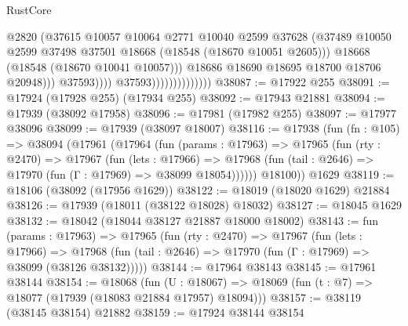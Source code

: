 \begin{lexlean}{RustCore}
\begin{coremodule}
                                              @2820
                                              (@37615
                                                @10057
                                                @10064
                                                @2771
                                                @10040
                                                @2599
                                                @37628
                                                (@37489
                                                  @10050
                                                  @2599
                                                  @37498
                                                  @37501
                                                  @18668
                                                  (@18548 (@18670 @10051 @2605)))
                                                @18668
                                                (@18548 (@18670 @10041 @10057)))
                                              @18686
                                              @18690
                                              @18695
                                              @18700
                                              @18706
                                              @20948)))
                                        @37593))))
                                @37593))))))))))))))
@38087 := @17922 @255
@38091 := @17924 (@17928 @255) (@17934 @255)
@38092 := @17943 @21881
@38094 := @17939 (@38092 @17958)
@38096 := @17981 (@17982 @255)
@38097 := @17977 @38096
@38099 := @17939 (@38097 @18007)
@38116 := @17938
    (fun (fn : @105) =>
    @38094
      (@17961
        (@17964
          (fun (params : @17963) =>
          @17965
            (fun (rty : @2470) =>
            @17967
              (fun (lets : @17966) =>
              @17968 (fun (tail : @2646) => @17970 (fun (Γ : @17969) => @38099 @18054))))))
        @18100))
    @1629
@38119 := @18106 (@38092 (@17956 @1629))
@38122 := @18019 (@18020 @1629) @21884
@38126 := @17939 (@18011 (@38122 @18028) @18032)
@38127 := @18045 @1629
@38132 := @18042 (@18044 @38127 @21887 @18000 @18002)
@38143 := fun (params : @17963) =>
  @17965
    (fun (rty : @2470) =>
    @17967
      (fun (lets : @17966) =>
      @17968 (fun (tail : @2646) => @17970 (fun (Γ : @17969) => @38099 (@38126 @38132)))))
@38144 := @17964 @38143
@38145 := @17961 @38144
@38154 := @18068
    (fun (U : @18067) => @18069 (fun (t : @7) => @18077 (@17939 (@18083 @21884 @17957) @18094)))
@38157 := @38119 (@38145 @38154) @21882
@38159 := @17924 @38144 @38154

\end{coremodule}
\end{lexlean}
